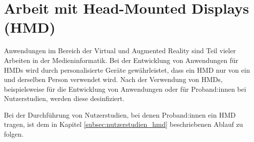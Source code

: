 \section{Arbeit mit Head-Mounted Displays (HMD)}\label{sec:hmd}

\medskip
\noindent
Anwendungen im Bereich der Virtual und Augmented Reality sind Teil vieler Arbeiten in der Medieninformatik.
Bei der Entwicklung von Anwendungen für HMDs wird durch personalisierte Geräte gewährleistet, dass ein HMD nur von ein und derselben Person verwendet wird.
Nach der Verwendung von HMDs, beispielsweise für die Entwicklung von Anwendungen oder für Proband:innen bei Nutzerstudien, werden diese desinfiziert.

\medskip
\noindent
Bei der Durchführung von Nutzerstudien, bei denen Proband:innen ein HMD tragen, ist dem in Kapitel \ref{subsec:nutzerstudien_hmd} beschriebenen Ablauf zu folgen.
